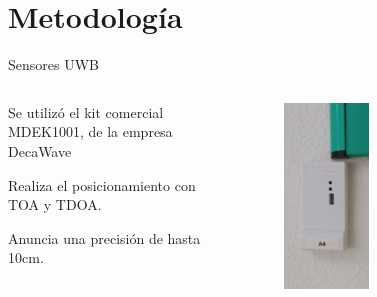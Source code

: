 \documentclass{beamer}
\begin{document}
\section{Metodología}

  \begin{frame}{Sensores UWB}
    \begin{columns}
      \begin{column}{0.5\textwidth}
        Se utilizó el kit comercial MDEK1001, de la empresa DecaWave

        \vspace{0.5cm}
        Realiza el posicionamiento con TOA y TDOA.

        \vspace{0.5cm}
        Anuncia una precisión de hasta 10cm.
      \end{column}
      \begin{column}{0.5\textwidth}  
        \begin{figure}[H]
          \centering
          \includegraphics[width=0.45\textwidth]{pic/sensor.jpg}
          \label{fig:robot}
      \end{figure}
      \end{column}
    \end{columns}
  \end{frame}
\end{document}
